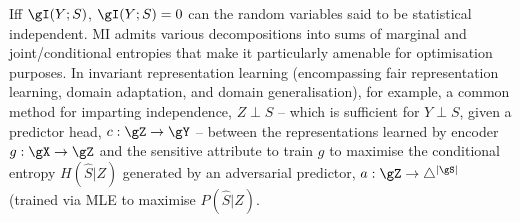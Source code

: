 Iff \( \gI(Y;S)\), \( \gI(Y;S) = 0  \) can the random variables said to be statistical independent.
%
MI admits various decompositions into sums of marginal and joint/conditional entropies that make it
particularly amenable for optimisation purposes. 
%
In invariant representation learning (encompassing fair representation learning, domain adaptation,
and domain generalisation), for example, a common method for imparting independence, \(Z \perp S \)
-- which is sufficient for \(Y \perp S\), given a predictor head, \(c: \gZ \to \gY \) -- between
the representations learned by encoder \(g: \gX \to \gZ \) and the sensitive attribute to train
\(g\) to maximise the conditional entropy \( H(\hat{S}|Z) \) generated by an adversarial predictor,
\(a: \gZ \to \bigtriangleup^{|\gS|}\) (trained via MLE to maximise \( P(\hat{S}|Z) \).


